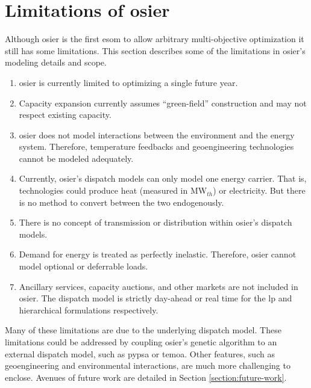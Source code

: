 \section{Limitations of \ac{osier}}

Although \ac{osier} is the first \ac{esom} to allow arbitrary multi-objective
optimization it still has some limitations. This section describes some of the limitations in \ac{osier}'s modeling details
and scope.

\begin{enumerate}
    \item \ac{osier} is currently limited to optimizing a single future year.
    \item Capacity expansion currently assumes ``green-field'' construction and
    may not respect existing capacity.
    \item \ac{osier} does not model interactions between the environment and the
    energy system. Therefore, temperature feedbacks and geoengineering
    technologies cannot be modeled adequately. 
    \item Currently, \ac{osier}'s dispatch models can only model one energy carrier. That is, technologies
    could produce heat (measured in MW$_{th}$) or electricity. But there is no method
    to convert between the two endogenously.
    \item There is no concept of transmission or distribution within \ac{osier}'s dispatch
    models. 
    \item Demand for energy is treated as perfectly inelastic. Therefore, \ac{osier} cannot model 
    optional or deferrable loads.
    \item Ancillary services, capacity auctions, and other markets are not included in \ac{osier}. The dispatch
    model is strictly day-ahead or real time for the \ac{lp} and hierarchical formulations respectively.
\end{enumerate}

Many of these limitations are due to the underlying dispatch model. These limitations could be addressed 
by coupling \ac{osier}'s genetic algorithm to an external dispatch model, such as \ac{pypsa} or \ac{temoa}.
Other features, such as geoengineering and environmental interactions, are much more challenging to enclose.
Avenues of future work are detailed in Section \ref{section:future-work}.

